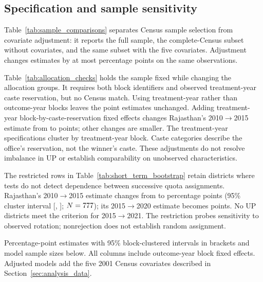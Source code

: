 \subsection{Specification and sample sensitivity}

Table~\ref{tab:sample_comparisons} separates Census sample selection from covariate adjustment: it reports the full sample, the complete-Census subset without covariates, and the same subset with the five covariates. Adjustment changes estimates by at most \maxWithinSampleAdjustment{} percentage points on the same observations.

Table~\ref{tab:allocation_checks} holds the sample fixed while changing the allocation groups. It requires both block identifiers and observed treatment-year caste reservation, but no Census match. Using treatment-year rather than outcome-year blocks leaves the point estimates unchanged. Adding treatment-year block-by-caste-reservation fixed effects changes Rajasthan's 2010$\rightarrow$2015 estimate from \rajShortTwo{} to \rajCasteShortTwo{} points; other changes are smaller. The treatment-year specifications cluster by treatment-year block. Caste categories describe the office's reservation, not the winner's caste. These adjustments do not resolve imbalance in UP or establish comparability on unobserved characteristics.

The restricted rows in Table~\ref{tab:short_term_bootstrap} retain districts where tests do not detect dependence between successive quota assignments. Rajasthan's 2010$\rightarrow$2015 estimate changes from \rajShortTwo{} to \rajRestrictedShortTwo{} percentage points (95\% cluster interval [\rajRestrictedShortTwoLow{}, \rajRestrictedShortTwoHigh{}]; $N=777{}$); its 2015$\rightarrow$2020 estimate becomes \rajRestrictedShortThree{} points. No UP districts meet the criterion for 2015$\rightarrow$2021. The restriction probes sensitivity to observed rotation; nonrejection does not establish random assignment.

\begin{table}[!htbp]
    \centering
    \caption{Separating Census Sample Selection from Covariate Adjustment}
    \label{tab:sample_comparisons}
    \small
    
    \par\smallskip
    \begin{minipage}{\textwidth}\footnotesize
    Percentage-point estimates with 95\% block-clustered intervals in brackets and model sample sizes below. All columns include outcome-year block fixed effects. Adjusted models add the five 2001 Census covariates described in Section~\ref{sec:analysis_data}.
    \end{minipage}
\end{table}
\FloatBarrier

